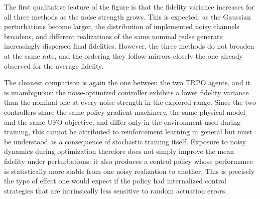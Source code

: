 The first qualitative feature of the figure is that the fidelity variance increases for all three methods as the noise strength grows. This is expected: as the Gaussian perturbations become larger, the distribution of implemented noisy channels broadens, and different realizations of the same nominal pulse generate increasingly dispersed final fidelities. However, the three methods do not broaden at the same rate, and the ordering they follow mirrors closely the one already observed for the average fidelity.

The cleanest comparison is again the one between the two TRPO agents, and it is unambiguous: the noise-optimized controller exhibits a lower fidelity variance than the nominal one at every noise strength in the explored range. Since the two controllers share the same policy-gradient machinery, the same physical model and the same UFO objective, and differ only in the environment used during training, this cannot be attributed to reinforcement learning in general but must be understood as a consequence of stochastic training itself. Exposure to noisy dynamics during optimization therefore does not simply improve the mean fidelity under perturbations; it also produces a control policy whose performance is statistically more stable from one noisy realization to another. This is precisely the type of effect one would expect if the policy had internalized control strategies that are intrinsically less sensitive to random actuation errors.

